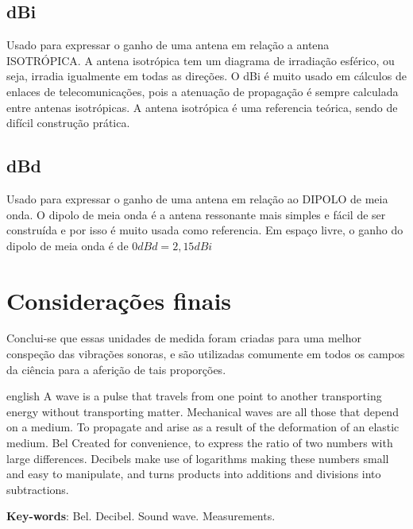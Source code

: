 \documentclass[
	article,			%
	11pt,				%
	oneside,			%
	a4paper,			%
	english,			%
	brazil,				%
	sumario=tradicional
	]{abntex2}
\begin{document}
\subsection{dBi}
Usado para expressar o ganho de uma antena em relação a antena ISOTRÓPICA. A antena isotrópica tem um diagrama de irradiação esférico, ou seja, irradia igualmente em todas as direções. O dBi é muito usado em cálculos de enlaces de telecomunicações, pois a atenuação de propagação é sempre calculada entre antenas isotrópicas. A antena isotrópica é uma referencia teórica, sendo de difícil construção prática.

\subsection{dBd}
Usado para expressar o ganho de uma antena em relação ao DIPOLO de meia onda. O dipolo de meia onda é a antena ressonante mais simples e fácil de ser construída e por isso é muito usada como referencia. Em espaço livre, o ganho do dipolo de meia onda é de $0 dBd = 2,15 dBi$


\section*{Considerações finais}

Conclui-se que essas unidades de medida foram criadas para uma melhor conspeção das vibrações sonoras, e são utilizadas comumente em todos os campos da ciência para a aferição de tais proporções.


\postextual



\emptythanks
\maketitle

\renewcommand{\resumoname}{Abstract}
\begin{resumoumacoluna}
 \begin{otherlanguage*}{english}
   A wave is a pulse that travels from one point to another transporting energy without transporting matter. Mechanical waves are all those that depend on a medium. To propagate and arise as a result of the deformation of an elastic medium. Bel Created for convenience, to express the ratio of two numbers with large differences. Decibels make use of logarithms making these numbers small and easy to manipulate, and turns products into additions and divisions into subtractions.

   \vspace{\onelineskip}
 
   \noindent
   \textbf{Key-words}: Bel. Decibel. Sound wave. Measurements.
 \end{otherlanguage*}  
\end{resumoumacoluna}




\end{document}
